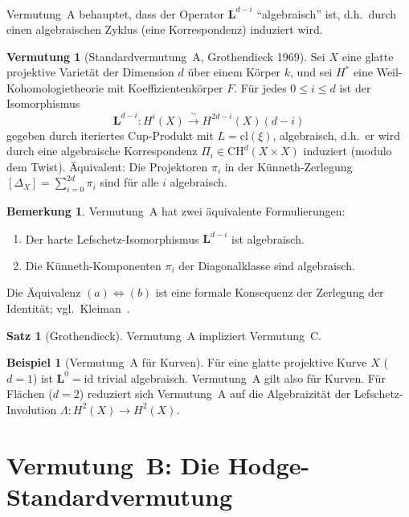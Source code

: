 \documentclass[12pt,a4paper]{amsart}
\theoremstyle{definition}
\newtheorem{example}[theorem]{Beispiel}
\newtheorem{satz}[theorem]{Satz}
\newtheorem{vermutung}[theorem]{Vermutung}
\newtheorem{bemerkung}[theorem]{Bemerkung}
\newcommand{\id}{\mathrm{id}}
\newcommand{\CH}{\mathrm{CH}}
\newcommand{\cl}{\mathrm{cl}}
\begin{document}
Vermutung~A behauptet, dass der Operator $\mathbf{L}^{d-i}$ ``algebraisch''
ist, d.h.\ durch einen algebraischen Zyklus (eine Korrespondenz) induziert wird.

\begin{vermutung}[Standardvermutung~A, Grothendieck 1969]\label{verm:A}
Sei $X$ eine glatte projektive Varietät der Dimension $d$ über einem Körper $k$,
und sei $H^*$ eine Weil-Kohomologietheorie mit Koeffizientenkörper $F$.
Für jedes $0 \leq i \leq d$ ist der Isomorphismus
\[
  \mathbf{L}^{d-i} : H^i(X) \xrightarrow{\;\sim\;} H^{2d-i}(X)(d-i)
\]
gegeben durch iteriertes Cup-Produkt mit $L = \cl(\xi)$, algebraisch,
d.h.\ er wird durch eine algebraische Korrespondenz $\Pi_i \in \CH^d(X \times X)$
induziert (modulo dem Twist).
Äquivalent: Die Projektoren $\pi_i$ in der Künneth-Zerlegung
$[\Delta_X] = \sum_{i=0}^{2d} \pi_i$ sind für alle $i$ algebraisch.
\end{vermutung}

\begin{bemerkung}
Vermutung~A hat zwei äquivalente Formulierungen:
\begin{enumerate}[label=(\alph*)]
  \item Der harte Lefschetz-Isomorphismus $\mathbf{L}^{d-i}$ ist algebraisch.
  \item Die Künneth-Komponenten $\pi_i$ der Diagonalklasse sind algebraisch.
\end{enumerate}
Die Äquivalenz $(a) \Leftrightarrow (b)$ ist eine formale Konsequenz der
Zerlegung der Identität; vgl.\ Kleiman~\cite{kleiman1968}.
\end{bemerkung}

\begin{satz}[Grothendieck]
Vermutung~A impliziert Vermutung~C.
\end{satz}

\begin{example}[Vermutung~A für Kurven]
Für eine glatte projektive Kurve $X$ ($d=1$) ist $\mathbf{L}^0 = \id$
trivial algebraisch.  Vermutung~A gilt also für Kurven.  Für Flächen ($d=2$)
reduziert sich Vermutung~A auf die Algebraizität der Lefschetz-Involution
$\Lambda: H^2(X) \to H^2(X)$.
\end{example}

\section{Vermutung~B: Die Hodge-Standardvermutung}\label{sec:vermutungB}
\end{document}
